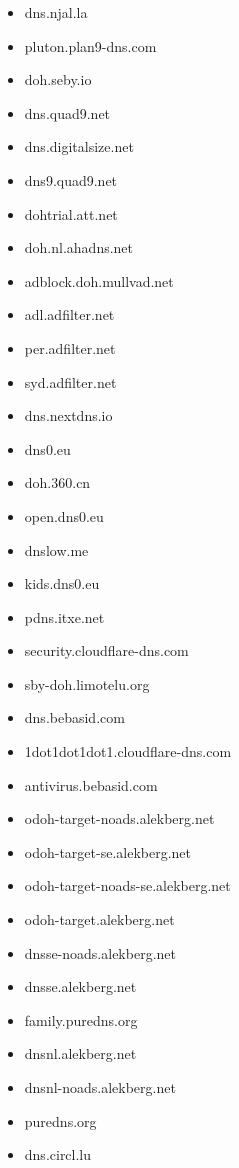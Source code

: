 \begin{itemize}
\item dns.njal.la
\item pluton.plan9-dns.com
\item doh.seby.io
\item dns.quad9.net
\item dns.digitalsize.net
\item dns9.quad9.net
\item dohtrial.att.net
\item doh.nl.ahadns.net
\item adblock.doh.mullvad.net
\item adl.adfilter.net
\item per.adfilter.net
\item syd.adfilter.net
\item dns.nextdns.io
\item dns0.eu
\item doh.360.cn
\item open.dns0.eu
\item dnslow.me
\item kids.dns0.eu
\item pdns.itxe.net
\item security.cloudflare-dns.com
\item sby-doh.limotelu.org
\item dns.bebasid.com
\item 1dot1dot1dot1.cloudflare-dns.com
\item antivirus.bebasid.com
\item odoh-target-noads.alekberg.net
\item odoh-target-se.alekberg.net
\item odoh-target-noads-se.alekberg.net
\item odoh-target.alekberg.net
\item dnsse-noads.alekberg.net
\item dnsse.alekberg.net
\item family.puredns.org
\item dnsnl.alekberg.net
\item dnsnl-noads.alekberg.net
\item puredns.org
\item dns.circl.lu
\end{itemize}
